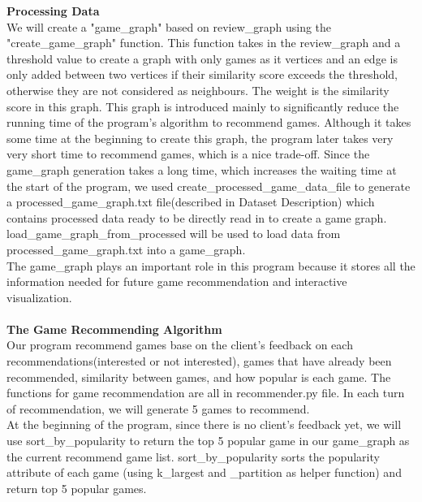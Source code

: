 \documentclass{article}
\begin{document}
\textbf{Processing Data} \\
We will create a "game\_graph" based on review\_graph using the "create\_game\_graph" function. This function takes in the review\_graph and a threshold value to create a graph with only games as it vertices and an edge is only added between two vertices if their similarity score exceeds the threshold, otherwise they are not considered as neighbours. The weight is the similarity score in this graph. This graph is introduced mainly to significantly reduce the running time of the program's algorithm to recommend games. Although it takes some time at the beginning to create this graph, the program later takes very very short time to recommend games, which is a nice trade-off. Since the game\_graph generation takes a long time, which increases the waiting time at the start of the program, we used create\_processed\_game\_data\_file to generate a processed\_game\_graph.txt file(described in Dataset Description) which contains processed data ready to be directly read in to create a game graph. load\_game\_graph\_from\_processed will be used to load data from processed\_game\_graph.txt into a game\_graph.\\
The game\_graph plays an important role in this program because it stores all the information needed for future game recommendation and interactive visualization. \\\\
\textbf{The Game Recommending Algorithm} \\
Our program recommend games base on the client's feedback on each recommendations(interested or not interested), games that have already been recommended, similarity between games, and how popular is each game. The functions for game recommendation are all in recommender.py file. In each turn of recommendation, we will generate 5 games to recommend. \\
At the beginning of the program, since there is no client's feedback yet, we will use sort\_by\_popularity to return the top 5 popular game in our game\_graph as the current recommend game list. sort\_by\_popularity sorts the popularity attribute of each game (using k\_largest and \_partition as helper function) and return top 5 popular games.\\ 
\end{document}
